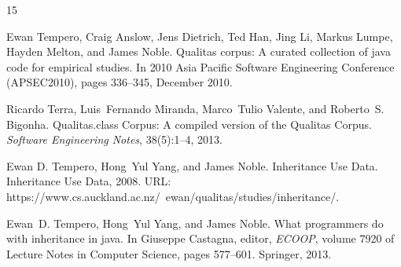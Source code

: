\documentclass [11pt, parskip=full] {article}
\begin{document}
\begin{thebibliography} {15}


Ewan Tempero, Craig Anslow, Jens Dietrich, Ted Han, Jing Li, Markus Lumpe,
  Hayden Melton, and James Noble.
  Qualitas corpus: A curated collection of java code for empirical
  studies.
  In {2010 Asia Pacific Software Engineering Conference
  (APSEC2010)}, pages 336--345, December 2010.


Ricardo Terra, Luis~Fernando Miranda, Marco~Tulio Valente, and Roberto~S.
  Bigonha.
  {Q}ualitas.class {C}orpus: A compiled version of the {Q}ualitas
  {C}orpus.
  {\em Software Engineering Notes}, 38(5):1--4, 2013.

Ewan D. Tempero, Hong~Yul Yang, and James Noble.
  {Inheritance Use Data}.
  Inheritance Use Data, 2008.
  URL:
  {https://www.cs.auckland.ac.nz/~ewan/qualitas/studies/inheritance/}.

Ewan~D. Tempero, Hong~Yul Yang, and James Noble.
  What programmers do with inheritance in java.
  In Giuseppe Castagna, editor, {\em ECOOP}, volume 7920 of {
  Lecture Notes in Computer Science}, pages 577--601. Springer, 2013.

\end{thebibliography}
\end{document}
